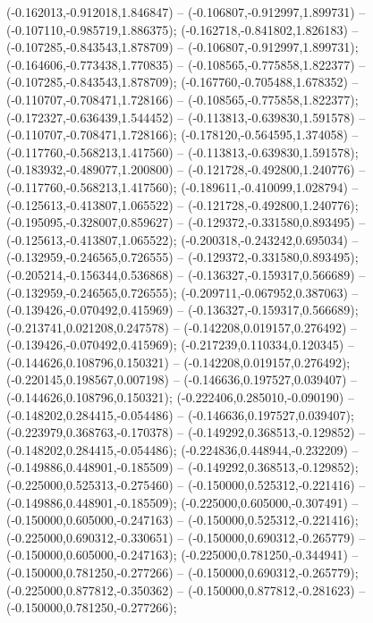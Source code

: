  (-0.162013,-0.912018,1.846847) -- (-0.106807,-0.912997,1.899731) -- (-0.107110,-0.985719,1.886375);
 (-0.162718,-0.841802,1.826183) -- (-0.107285,-0.843543,1.878709) -- (-0.106807,-0.912997,1.899731);
 (-0.164606,-0.773438,1.770835) -- (-0.108565,-0.775858,1.822377) -- (-0.107285,-0.843543,1.878709);
 (-0.167760,-0.705488,1.678352) -- (-0.110707,-0.708471,1.728166) -- (-0.108565,-0.775858,1.822377);
 (-0.172327,-0.636439,1.544452) -- (-0.113813,-0.639830,1.591578) -- (-0.110707,-0.708471,1.728166);
 (-0.178120,-0.564595,1.374058) -- (-0.117760,-0.568213,1.417560) -- (-0.113813,-0.639830,1.591578);
 (-0.183932,-0.489077,1.200800) -- (-0.121728,-0.492800,1.240776) -- (-0.117760,-0.568213,1.417560);
 (-0.189611,-0.410099,1.028794) -- (-0.125613,-0.413807,1.065522) -- (-0.121728,-0.492800,1.240776);
 (-0.195095,-0.328007,0.859627) -- (-0.129372,-0.331580,0.893495) -- (-0.125613,-0.413807,1.065522);
 (-0.200318,-0.243242,0.695034) -- (-0.132959,-0.246565,0.726555) -- (-0.129372,-0.331580,0.893495);
 (-0.205214,-0.156344,0.536868) -- (-0.136327,-0.159317,0.566689) -- (-0.132959,-0.246565,0.726555);
 (-0.209711,-0.067952,0.387063) -- (-0.139426,-0.070492,0.415969) -- (-0.136327,-0.159317,0.566689);
 (-0.213741,0.021208,0.247578) -- (-0.142208,0.019157,0.276492) -- (-0.139426,-0.070492,0.415969);
 (-0.217239,0.110334,0.120345) -- (-0.144626,0.108796,0.150321) -- (-0.142208,0.019157,0.276492);
 (-0.220145,0.198567,0.007198) -- (-0.146636,0.197527,0.039407) -- (-0.144626,0.108796,0.150321);
 (-0.222406,0.285010,-0.090190) -- (-0.148202,0.284415,-0.054486) -- (-0.146636,0.197527,0.039407);
 (-0.223979,0.368763,-0.170378) -- (-0.149292,0.368513,-0.129852) -- (-0.148202,0.284415,-0.054486);
 (-0.224836,0.448944,-0.232209) -- (-0.149886,0.448901,-0.185509) -- (-0.149292,0.368513,-0.129852);
 (-0.225000,0.525313,-0.275460) -- (-0.150000,0.525312,-0.221416) -- (-0.149886,0.448901,-0.185509);
 (-0.225000,0.605000,-0.307491) -- (-0.150000,0.605000,-0.247163) -- (-0.150000,0.525312,-0.221416);
 (-0.225000,0.690312,-0.330651) -- (-0.150000,0.690312,-0.265779) -- (-0.150000,0.605000,-0.247163);
 (-0.225000,0.781250,-0.344941) -- (-0.150000,0.781250,-0.277266) -- (-0.150000,0.690312,-0.265779);
 (-0.225000,0.877812,-0.350362) -- (-0.150000,0.877812,-0.281623) -- (-0.150000,0.781250,-0.277266);
